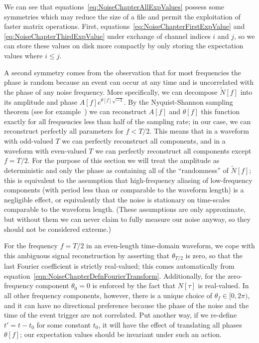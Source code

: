 We can see that equations~\ref{eq:NoiseChapterAllExpValues} possess some symmetries which may reduce the size of a file and permit the exploitation of faster matrix operations.  First, equations~\ref{eq:NoiseChapterFirstExpValue} and \ref{eq:NoiseChapterThirdExpValue} under exchange of channel indices $i$ and $j$, so we can store these values on disk more compactly by only storing the expectation values where $i \leq j$.

A second symmetry comes from the observation that for most frequencies the phase is random because an event can occur at any time and is uncorrelated with the phase of any noise frequency.  More specifically, we can decompose $\widetilde{N}[f]$ into its amplitude and phase $A[f]e^{\theta[f] \sqrt{-1}}$.  By the Nyquist-Shannon sampling theorem (see for example~\cite{659497}) we can reconstruct $A[f]$ and $\theta[f]$ this function exactly for all frequencies less than half of the sampling rate; in our case, we can reconstruct perfectly all parameters for $f < T/2$.  This means that in a waveform with odd-valued $T$ we can perfectly reconstruct all components, and in a waveform with even-valued $T$ we can perfectly reconstruct all components except $f = T/2$.  For the purpose of this section we will treat the amplitude as deterministic and only the phase as containing all of the ``randomness'' of $\widetilde{N}[f]$; this is equivalent to the assumption that high-frequency aliasing of low-frequency components (with period less than or comparable to the waveform length) is a negligible effect, or equivalently that the noise is stationary on time-scales comparable to the waveform length.  (These assumptions are only approximate, but without them we can never claim to fully measure our noise anyway, so they should not be considered extreme.)

For the frequency $f = T/2$ in an even-length time-domain waveform, we cope with this ambiguous signal reconstruction by asserting that $\theta_{T/2}$ is zero, so that the last Fourier coefficient is strictly real-valued; this comes automatically from equation~\ref{eqn:NoiseChapterDefnFourierTransform}.  Additionally, for the zero-frequency component $\theta_0 = 0$ is enforced by the fact that $N[\tau]$ is real-valued.  In all other frequency components, however, there is a unique choice of $\theta_f \in [0,2\pi)$, and it can have no directional preference because the phase of the noise and the time of the event trigger are not correlated.  Put another way, if we re-define $t' = t - t_0$ for some constant $t_0$, it will have the effect of translating all phases $\theta[f]$; our expectation values should be invariant under such an action.

